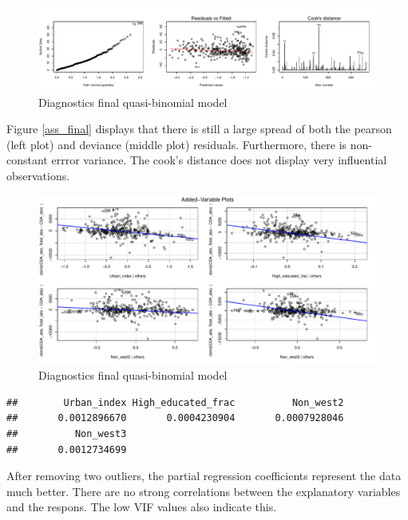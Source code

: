 \documentclass[11pt,]{article}
\begin{document}
\begin{figure}[H]

{\centering \includegraphics{Report_files/figure-latex/unnamed-chunk-21-1} 

}

\caption{\label{ass_final}Diagnostics final quasi-binomial model}\label{fig:unnamed-chunk-21}
\end{figure}

Figure \ref{ass_final} displays that there is still a large spread of
both the pearson (left plot) and deviance (middle plot) residuals.
Furthermore, there is non-constant errror variance. The cook's distance
does not display very influential observations.

\begin{figure}[H]

{\centering \includegraphics{Report_files/figure-latex/unnamed-chunk-22-1} 

}

\caption{\label{av_final}Diagnostics final quasi-binomial model}\label{fig:unnamed-chunk-22}
\end{figure}

\begin{verbatim}
##        Urban_index High_educated_frac          Non_west2 
##       0.0012896670       0.0004230904       0.0007928046 
##          Non_west3 
##       0.0012734699
\end{verbatim}

After removing two outliers, the partial regression coefficients
represent the data much better. There are no strong correlations between
the explanatory variables and the respons. The low VIF values also
indicate this.
\end{document}
